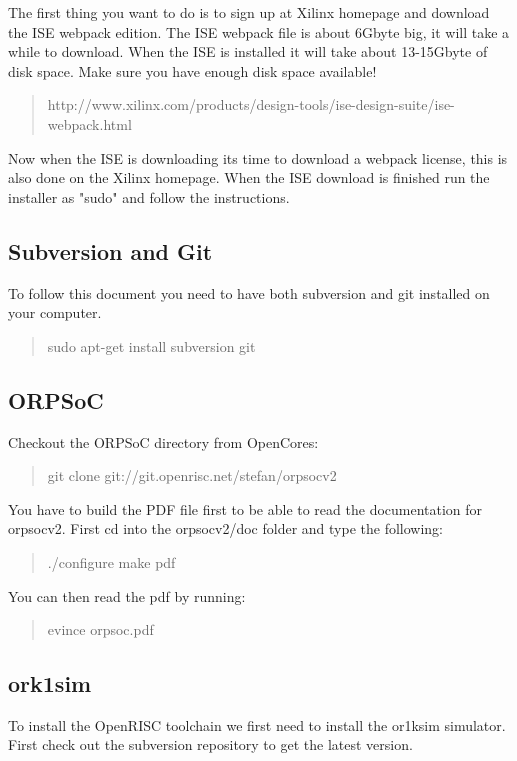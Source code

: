 \documentclass[10pt,a4paper]{article}
\begin{document}
The first thing you want to do is to sign up at Xilinx homepage and download the ISE webpack edition. The ISE webpack file is about 6Gbyte big, it will take a while to download. When the ISE is installed it will take about 13-15Gbyte of disk space. Make sure you have enough disk space available!

\begin{quote}
http://www.xilinx.com/products/design-tools/ise-design-suite/ise-webpack.html
\end{quote}

Now when the ISE is downloading its time to download a webpack license, this is also done on the Xilinx homepage. When the ISE download is finished run the installer as "sudo" and follow the instructions.

\subsection{Subversion and Git}
To follow this document you need to have both subversion and git installed on your computer.
\begin{quote}
\item sudo apt-get install subversion git
\end{quote}

\subsection{ORPSoC}
Checkout the ORPSoC directory from OpenCores:

\begin{quote}
git clone git://git.openrisc.net/stefan/orpsocv2
\end{quote}

You have to build the PDF file first to be able to read the documentation for orpsocv2. First cd into the orpsocv2/doc folder and type the following:
\begin{quote}
./configure \newline
make pdf
\end{quote}

You can then read the pdf by running:

\begin{quote}
evince orpsoc.pdf
\end{quote}

\subsection{ork1sim}
To install the OpenRISC toolchain we first need to install the or1ksim simulator. First check out the subversion repository to get the latest version.
\end{document}

